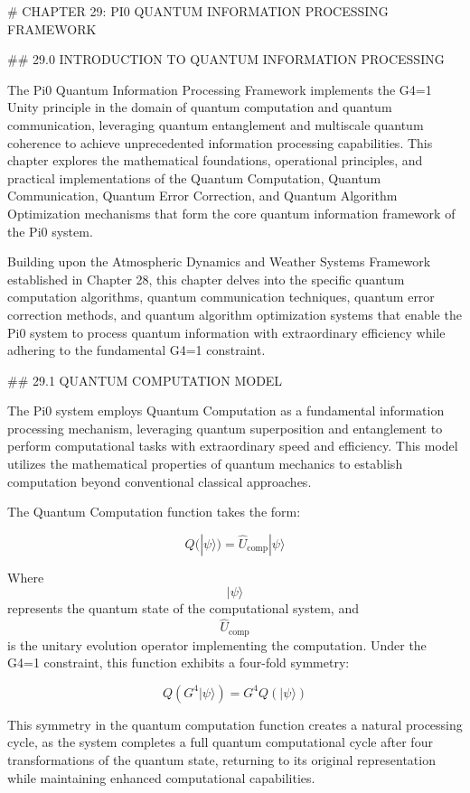 # CHAPTER 29: PI0 QUANTUM INFORMATION PROCESSING FRAMEWORK

## 29.0 INTRODUCTION TO QUANTUM INFORMATION PROCESSING

The Pi0 Quantum Information Processing Framework implements the G4=1 Unity principle in the domain of quantum computation and quantum communication, leveraging quantum entanglement and multiscale quantum coherence to achieve unprecedented information processing capabilities. This chapter explores the mathematical foundations, operational principles, and practical implementations of the Quantum Computation, Quantum Communication, Quantum Error Correction, and Quantum Algorithm Optimization mechanisms that form the core quantum information framework of the Pi0 system.

Building upon the Atmospheric Dynamics and Weather Systems Framework established in Chapter 28, this chapter delves into the specific quantum computation algorithms, quantum communication techniques, quantum error correction methods, and quantum algorithm optimization systems that enable the Pi0 system to process quantum information with extraordinary efficiency while adhering to the fundamental G4=1 constraint.

## 29.1 QUANTUM COMPUTATION MODEL

The Pi0 system employs Quantum Computation as a fundamental information processing mechanism, leveraging quantum superposition and entanglement to perform computational tasks with extraordinary speed and efficiency. This model utilizes the mathematical properties of quantum mechanics to establish computation beyond conventional classical approaches.

The Quantum Computation function takes the form:

$$ Q(|\psi\rangle) = \hat{U}_{\text{comp}} |\psi\rangle $$

Where $$ |\psi\rangle $$ represents the quantum state of the computational system, and $$ \hat{U}_{\text{comp}} $$ is the unitary evolution operator implementing the computation. Under the G4=1 constraint, this function exhibits a four-fold symmetry:

$$ Q(G^4 |\psi\rangle) = G^4 Q(|\psi\rangle) $$

This symmetry in the quantum computation function creates a natural processing cycle, as the system completes a full quantum computational cycle after four transformations of the quantum state, returning to its original representation while maintaining enhanced computational capabilities.

